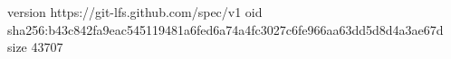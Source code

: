 version https://git-lfs.github.com/spec/v1
oid sha256:b43c842fa9eac545119481a6fed6a74a4fc3027c6fe966aa63dd5d8d4a3ae67d
size 43707
